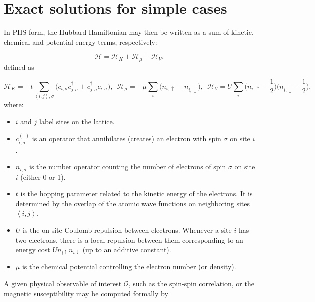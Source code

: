 \section{Exact solutions for simple cases}\label{sec:exactSolutions}

In \ac{PHS} form, the Hubbard Hamiltonian may then be written as a sum of kinetic, chemical and potential energy terms, respectively:

\begin{equation}\label{eq:hubbard}
\mathcal{H} = \mathcal{H}_K + \mathcal{H}_\mu + \mathcal{H}_V ,
\end{equation}
defined as

\begin{equation}\label{eq:def_energies}
\mathcal{H}_K = -t \sum_{\left\langle i, j \right \rangle, \sigma} \bigg( c_{i,\sigma} c_{j,\sigma}^\dagger + c_{j,\sigma}^\dagger c_{i,\sigma} \bigg) , \,\,\,
\mathcal{H}_\mu = -\mu \sum_i \bigg( n_{i,\uparrow} + n_{i,\downarrow} \bigg) , \,\,\,
\mathcal{H}_V = U \sum_{i} \bigg( n_{i,\uparrow} - \frac{1}{2} \bigg) \bigg( n_{i,\downarrow} - \frac{1}{2} \bigg) ,
\end{equation}
where:

\begin{itemize}
\item $i$ and $j$ label sites on the lattice.
\item $c_{i,\sigma}^{(\dagger)}$ is an operator that annihilates (creates) an electron with spin $\sigma$ on site $i$.
\item $n_{i,\sigma}$ is the number operator counting the number of electrons of spin $\sigma$ on site $i$ (either 0 or 1).
\item $t$ is the hopping parameter related to the kinetic energy of the electrons.
It is determined by the overlap of the atomic wave functions on neighboring sites $\left\langle i, j \right\rangle$.
\item $U$ is the on-site Coulomb repulsion between electrons.
Whenever a site $i$ has two electrons, there is a local repulsion between them corresponding to an energy cost $U n_{i \uparrow} n_{i \downarrow}$ (up to an additive constant).
\item $\mu$ is the chemical potential controlling the electron number (or density).
\end{itemize}

A given physical observable of interest $\mathcal{O}$, such as the spin-spin correlation, or the magnetic susceptibility may be computed formally by

